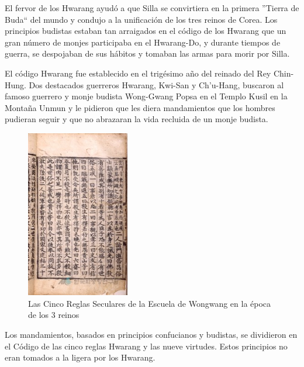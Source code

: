El fervor de los Hwarang ayudó a que Silla se convirtiera en la primera ''Tierra de Buda`` del mundo y condujo a la unificación de los tres reinos de Corea. Los principios budistas estaban tan arraigados en el código de los Hwarang que un gran número de monjes participaba en el Hwarang-Do, y durante tiempos de guerra, se despojaban de sus hábitos y tomaban las armas para morir por Silla.

El código Hwarang fue establecido en el trigésimo año del reinado del Rey Chin-Hung. Dos destacados guerreros Hwarang, Kwi-San y Ch'u-Hang, buscaron al famoso guerrero y monje budista Wong-Gwang Popsa en el Templo Kusil en la Montaña Unmun y le pidieron que les diera mandamientos que los hombres pudieran seguir y que no abrazaran la vida recluida de un monje budista.

\begin{figure}[h]
	\centering
	\includegraphics[width=0.4\textwidth]{images/Historia/codigo_hwarang.jpg} %
	\caption{Las Cinco Reglas Seculares de la Escuela de Wongwang en la época de los 3 reinos}
\end{figure}

Los mandamientos, basados en principios confucianos y budistas, se dividieron en el Código de las cinco reglas Hwarang y las nueve virtudes. Estos principios no eran tomados a la ligera por los Hwarang.


